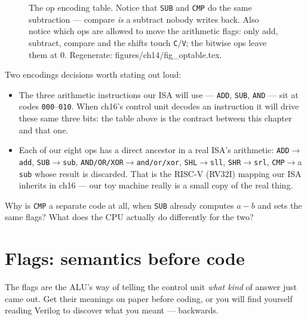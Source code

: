 \begin{figure}[htbp]
\centering

\caption{The op encoding table. Notice that \texttt{SUB} and
\texttt{CMP} do the same subtraction --- compare \emph{is} a subtract
nobody writes back. Also notice which ops are allowed to move the
arithmetic flags: only add, subtract, compare and the shifts touch
\texttt{C}/\texttt{V}; the bitwise ops leave them at 0.
Regenerate: \ttfamily figures/ch14/fig\_optable.tex.}
\label{fig:optable14}
\end{figure}

Two encodings decisions worth stating out loud:

\begin{itemize}
\item The three arithmetic instructions our ISA will use ---
\texttt{ADD}, \texttt{SUB}, \texttt{AND} --- sit at codes
\texttt{000}--\texttt{010}. When ch16's control unit decodes an
instruction it will drive these same three bits: the table above is
the contract between this chapter and that one.
\item Each of our eight ops has a direct ancestor in a real ISA's
arithmetic: \texttt{ADD}$\to$\texttt{add}, \texttt{SUB}$\to$\texttt{sub},
\texttt{AND/OR/XOR}$\to$\texttt{and/or/xor},
\texttt{SHL}$\to$\texttt{sll}, \texttt{SHR}$\to$\texttt{srl},
\texttt{CMP}$\to$a \texttt{sub} whose result is discarded. That is the
RISC-V (RV32I) mapping our ISA inherits in ch16 --- our toy machine
really is a small copy of the real thing.
\end{itemize}

\begin{exercise}[easy]
Why is \texttt{CMP} a separate code at all, when \texttt{SUB} already
computes $a-b$ and sets the same flags? What does the CPU actually do
differently for the two?
\end{exercise}

\section{Flags: semantics before code}\label{sec:flags14}

The flags are the ALU's way of telling the control unit \emph{what
kind} of answer just came out. Get their meanings on paper before
coding, or you will find yourself reading Verilog to discover what you
meant --- backwards.

